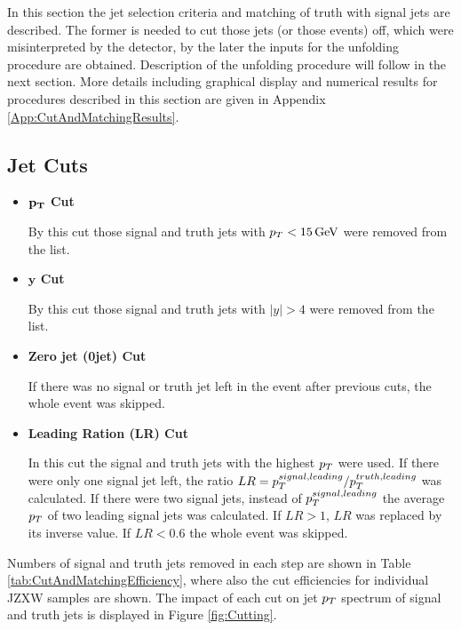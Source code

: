 In this section the jet selection criteria and matching of truth with signal
jets are described. The former is needed to cut those jets (or those events)
off, which were misinterpreted by the detector, by the later the inputs for the
unfolding procedure are obtained. Description of the unfolding procedure will
follow in the next section. More details including graphical display and
numerical results for procedures described in this section are given in Appendix
\ref{App:CutAndMatchingResults}.

\subsection{Jet Cuts}
\label{SubSec:JetCuts}

\begin{itemize}
  \item \textbf{$\mathbf{p_{T}}$ Cut}

    By this cut those signal and truth jets with $p_{T} < 15 \,\text{GeV}$ were removed from
    the list.

  \item \textbf{$\mathbf{y}$ Cut}
    
    By this cut those signal and truth jets with $|y| > 4$ were removed from the
    list.

  \item \textbf{Zero jet (0jet) Cut}

    If there was no signal or truth jet left in the event after previous cuts,
    the whole event was skipped.
    
  \item \textbf{Leading Ration (LR) Cut}

    In this cut the signal and truth jets with the highest $p_{T}$ were used. If
    there were only one signal jet left, the ratio $LR = p_{T}^{signal,leading} /
    p_{T}^{truth,leading}$ was calculated. If there were two signal jets, instead
    of $p_{T}^{signal,leading}$ the average $p_{T}$ of two leading signal jets was
    calculated. If $LR > 1$, $LR$ was replaced by its inverse value. If $LR <
    0.6$ the whole event was skipped.

\end{itemize}

Numbers of signal and truth jets removed in each step are shown in Table
\ref{tab:CutAndMatchingEfficiency}, where also the cut efficiencies for individual
JZXW samples are shown. The impact of each cut on jet $p_{T}$ spectrum of signal
and truth jets is displayed in Figure \ref{fig:Cutting}. 

